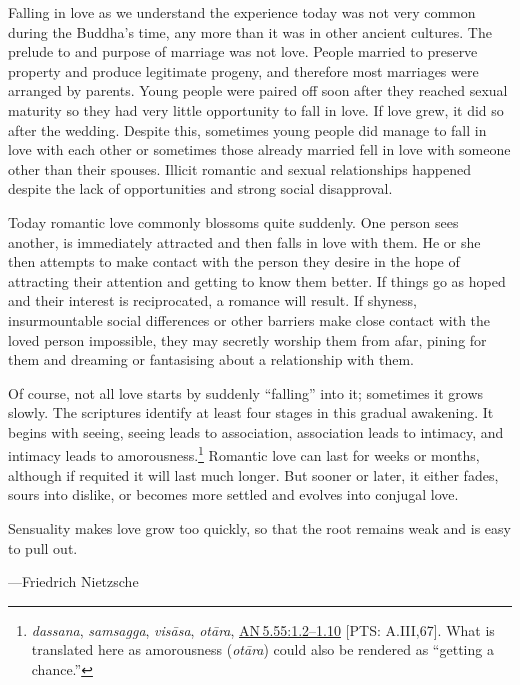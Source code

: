 \documentclass[10pt, openright]{book}
\newenvironment{epigram-2}%
{%
\setstretch{1.4}
\vspace{1em}
\noindent
\quoting[leftmargin=2cm,rightmargin=2cm]%
\begin{itshape}
\large
}%
{\end{itshape}\endquoting
}%
\newenvironment{epigram-2-cite}%
{%
\quoting[leftmargin=2cm,rightmargin=2cm]%
\noindent\normal\hspace*{\fill} 
}%
{\endquoting
}%
\begin{document}
Falling in love as we understand the experience today was not very common during the Buddha’s time, any more than it was in other ancient cultures. The prelude to and purpose of marriage was not love. People married to preserve property and produce legitimate progeny, and therefore most marriages were arranged by parents. Young people were paired off soon after they reached sexual maturity so they had very little opportunity to fall in love. If love grew, it did so after the wedding. Despite this, sometimes young people did manage to fall in love with each other or sometimes those already married fell in love with someone other than their spouses. Illicit romantic and sexual relationships happened despite the lack of opportunities and strong social disapproval.


Today romantic love commonly blossoms quite suddenly. One person sees another, is immediately attracted and then falls in love with them. He or she then attempts to make contact with the person they desire in the hope of attracting their attention and getting to know them better. If things go as hoped and their interest is reciprocated, a romance will result. If shyness, insurmountable social differences or other barriers make close contact with the loved person impossible, they may secretly worship them from afar, pining for them and dreaming or fantasising about a relationship with them.


Of course, not all love starts by suddenly “falling” into it; sometimes it grows slowly. The scriptures identify at least four stages in this gradual awakening. It begins with seeing, seeing leads to association, association leads to intimacy, and intimacy leads to amorousness.\footnote {\textit{dassana}, \textit{samsagga}, \textit{visāsa}, \textit{otāra}, \href{https://suttacentral.net/an5.55/en/sujato\#1.2}{AN 5.55:1.2–1.10} [PTS: A.III,67]. What is translated here as amorousness (\textit{otāra}) could also be rendered as “getting a chance.”} Romantic love can last for weeks or months, although if requited it will last much longer. But sooner or later, it either fades, sours into dislike, or becomes more settled and evolves into conjugal love.


\begin{epigram-2}
Sensuality makes love grow too quickly, so that the root remains weak and is easy to pull out.
\end{epigram-2}
\begin{epigram-2-cite}
—Friedrich Nietzsche
\end{epigram-2-cite}
\end{document}

